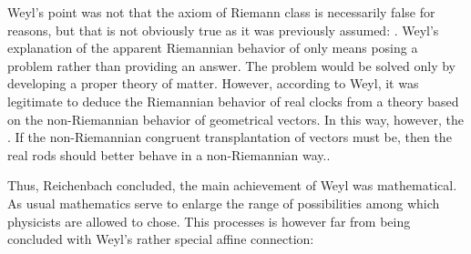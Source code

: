 \documentclass[draft]{article}
\begin{document}
%
%
Weyl's point was not that the axiom of Riemann class is necessarily false for \apr reasons, but that is not obviously true as it was previously assumed: . Weyl's explanation of the apparent Riemannian behavior of   \citep[368]{Reichenbach1922a} only means posing a problem rather than providing an answer. The problem would be solved only by developing a proper theory of matter. However, according to Weyl, it was legitimate to deduce the Riemannian behavior of real clocks from a theory based on the non-Riemannian behavior of geometrical vectors. In this way, however, the   \citep[368]{Reichenbach1922a}. If the non-Riemannian congruent transplantation of vectors must be, then the real rods should better behave in a non-Riemannian way.. 

Thus, Reichenbach concluded, the main achievement of Weyl was mathematical. As usual mathematics serve to enlarge the range of possibilities among which physicists are allowed to chose. This processes is however far from being concluded with Weyl's rather special affine connection:
\end{document}
